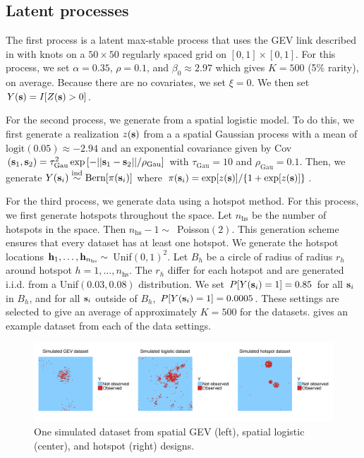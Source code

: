 \documentclass[12pt]{article}
\begin{document}
\subsection{Latent processes} \label{rbs:simsettings}

The first process is a latent max-stable process that uses the GEV link described in  with knots on a $50 \times 50$ regularly spaced grid on $[0, 1] \times [0, 1]$.
For this process, we set $\alpha = 0.35$, $\rho = 0.1$, and $\beta_0 \approx 2.97$ which gives $K = 500$ (5\% rarity), on average.
Because there are no covariates, we set $\xi = 0$.
We then set $Y(\mathbf{s}) = I[Z(\mathbf{s}) > 0]$.

For the second process, we generate from a spatial logistic model.
To do this, we first generate a realization $z(\mathbf{s})$ from a a spatial Gaussian process with a mean of $\text{logit}(0.05) \approx -2.94$ and an exponential covariance given by Cov$(\mathbf{s}_1, \mathbf{s}_2) = \tau_\text{Gau}^2 \exp\left[- ||\mathbf{s}_1 - \mathbf{s}_2|| / \rho_\text{Gau} \right]$ with $\tau_\text{Gau} = 10$ and $\rho_\text{Gau} = 0.1$.
Then, we generate $Y(\mathbf{s}_i) \stackrel{\mathrm{ind}}{\sim} \text{Bern}[\pi(\mathbf{s}_i)]$
where \mbox{$\pi(\mathbf{s}_i) = \exp[z(\mathbf{s})] / \{1 + \exp[z(\mathbf{s})] \}$}.

For the third process, we generate data using a hotspot method.
For this process, we first generate hotspots throughout the space.
Let $n_\text{hs}$ be the number of hotspots in the space.
Then \mbox{$n_\text{hs} - 1 \sim$ Poisson$(2)$}.
This generation scheme ensures that every dataset has at least one hotspot.
We generate the hotspot locations $\mathbf{h}_1, \ldots, \mathbf{h}_{n_\text{hs}} \sim$ Unif$(0, 1)^2$.
Let $B_h$ be a circle of radius of radius $r_h$ around hotspot $h = 1, \ldots, n_\text{hs}$.
The $r_h$ differ for each hotspot and are generated i.i.d. from a Unif$(0.03, 0.08)$ distribution.
We set $P[Y(\mathbf{s}_i) = 1] = 0.85$ for all $\mathbf{s}_i$ in $B_h$, and for all $\mathbf{s}_i$ outside of $B_h$, $P[Y(\mathbf{s}_i) = 1] = 0.0005$.
These settings are selected to give an average of approximately $K = 500$ for the datasets.
 gives an example dataset from each of the data settings.

\begin{figure}  %
	\centering
	\includegraphics[width=\linewidth, trim={0em, 1em, 0em, 1em}]{plots/simulateddata}
	\caption{One simulated dataset from spatial GEV (left), spatial logistic (center), and hotspot (right) designs.}
	\label{rbfig:simulateddata}
\end{figure}
\end{document}
